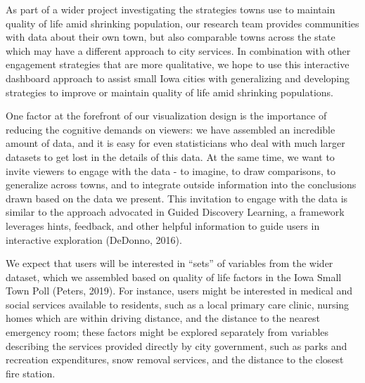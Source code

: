 \documentclass[print]{nuthesis}
\begin{document}
As part of a wider project investigating the strategies towns use to maintain quality of life amid shrinking population, our research team provides communities with data about their own town, but also comparable towns across the state which may have a different approach to city services. In combination with other engagement strategies that are more qualitative, we hope to use this interactive dashboard approach to assist small Iowa cities with generalizing and developing strategies to improve or maintain quality of life amid shrinking populations.

One factor at the forefront of our visualization design is the importance of reducing the cognitive demands on viewers: we have assembled an incredible amount of data, and it is easy for even statisticians who deal with much larger datasets to get lost in the details of this data. At the same time, we want to invite viewers to engage with the data - to imagine, to draw comparisons, to generalize across towns, and to integrate outside information into the conclusions drawn based on the data we present.
This invitation to engage with the data is similar to the approach advocated in Guided Discovery Learning, a framework leverages hints, feedback, and other helpful information to guide users in interactive exploration (DeDonno, 2016).

We expect that users will be interested in ``sets'' of variables from the wider dataset, which we assembled based on quality of life factors in the Iowa Small Town Poll (Peters, 2019). For instance, users might be interested in medical and social services available to residents, such as a local primary care clinic, nursing homes which are within driving distance, and the distance to the nearest emergency room; these factors might be explored separately from variables describing the services provided directly by city government, such as parks and recreation expenditures, snow removal services, and the distance to the closest fire station.
\end{document}
